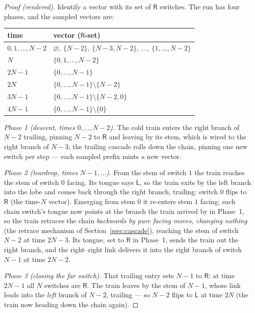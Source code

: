 \documentclass[11pt]{article}
\theoremstyle{definition}
\newcommand{\Left}{\mathsf{L}}
\newcommand{\Right}{\mathsf{R}}
\begin{document}
\begin{proof}[Proof (rendered)]
  Identify a vector with its set of $\Right$ switches.  The run has four
  phases, and the sampled vectors are:

  \begin{center}
  \begin{tabular}{ll}
    \toprule
    time & vector ($\Right$-set)\\
    \midrule
    $0,1,\dots,N-2$ &
      $\varnothing,\ \{N{-}2\},\ \{N{-}3,N{-}2\},\ \dots,\
       \{1,\dots,N{-}2\}$\\
    $N$ & $\{0,1,\dots,N{-}2\}$\\
    $2N-1$ & $\{0,\dots,N{-}1\}$\\
    $2N$ & $\{0,\dots,N{-}1\}\setminus\{N{-}2\}$\\
    $3N-1$ & $\{0,\dots,N{-}1\}\setminus\{N{-}2,0\}$\\
    $4N-1$ & $\{0,\dots,N{-}1\}\setminus\{0\}$\\
    \bottomrule
  \end{tabular}
  \end{center}

  \emph{Phase 1 (descent, times $0,\dots,N-2$).}  The cold train enters
  the right branch of $N-2$ trailing, pinning $N-2$ to $\Right$ and
  leaving by its stem, which is wired to the right branch of $N-3$; the
  trailing cascade rolls down the chain, pinning one new switch per step
  --- each sampled prefix mints a new vector.

  \emph{Phase 2 (teardrop, times $N-1,\dots$).}  From the stem of switch
  $1$ the train reaches the stem of switch $0$ facing.  Its tongue says
  $\Left$, so the train exits by the left branch into the lobe and comes
  back through the right branch, trailing: switch $0$ flips to $\Right$
  (the time-$N$ vector).  Emerging from stem $0$ it re-enters stem $1$
  facing; each chain switch's tongue now points at the branch the train
  arrived by in Phase~1, so the train retraces the chain \emph{backwards
  by pure facing moves, changing nothing} (the retrace mechanism of
  Section~\ref{ssec:cascade}), reaching the stem of switch $N-2$ at time
  $2N-3$.  Its tongue, set to $\Right$ in Phase~1, sends the train out
  the right branch, and the right--right link delivers it into the right
  branch of switch $N-1$ at time $2N-2$.

  \emph{Phase 3 (closing the far switch).}  That trailing entry sets
  $N-1$ to $\Right$: at time $2N-1$ all $N$ switches are $\Right$.  The
  train leaves by the stem of $N-1$, whose link leads into the
  \emph{left} branch of $N-2$, trailing --- so $N-2$ flips to $\Left$
  at time $2N$ (the train now heading down the chain again).


\end{proof}
\end{document}
